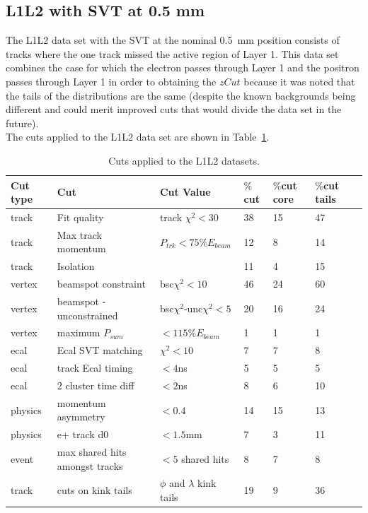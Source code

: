 \subsection{L1L2 with SVT at 0.5 mm}

The L1L2 data set with the SVT at the nominal 0.5~mm position consists of tracks where the one track missed the active region of Layer 1. This data set combines the case for which the electron passes through Layer 1 and the positron passes through Layer 1 in order to obtaining the $zCut$ because it was noted that the tails of the distributions are the same (despite the known backgrounds being different and could merit improved cuts that would divide the data set in the future). \\
\indent The cuts applied to the L1L2 data set are shown in Table~\ref{l1l2_cuts}. 

\begin{table}[H]
\caption{Cuts applied to the L1L2 datasets.}
\label{l1l2_cuts}
\centering
\begin{tabular}{lllllll}
\toprule
Cut type & Cut & Cut Value &  $\%$cut &  $\%$cut core & $\%$cut tails\\
\midrule
track & Fit quality & track $\chi^{2}<30$ & 38 & 15 & 47 \\
track & Max track momentum &  $P_{trk}<75\%E_{beam}$ & 12 & 8 & 14 \\
track & Isolation &   & 11 & 4 & 15 \\
vertex & beamspot constraint & bsc$\chi^{2}<10$  & 46 & 24 & 60 \\
vertex & beamspot - unconstrained & bsc$\chi^{2}$-unc$\chi^2<5$  & 20 & 16 & 24 \\
vertex & maximum $P_{sum}$ &  $<115\%E_{beam}$ & 1 & 1 & 1 \\
ecal & Ecal SVT matching & $\chi^2<10$  & 7 & 7 & 8 \\
ecal & track Ecal timing & $<4$ns  & 5 & 5 & 5 \\
ecal & 2 cluster time diff & $<2$ns  & 8 & 6 & 10 \\
physics & momentum asymmetry & $<0.4$  & 14 & 15 & 13 \\
physics & e+ track d0 & $<1.5$mm  & 7 & 3 & 11 \\
event & max shared hits amongst tracks & $<5$ shared hits  & 8 & 7 & 8 \\
track & cuts on kink tails & $\phi$ and $\lambda$ kink tails & 19 & 9 & 36 \\
\bottomrule
\end{tabular}
\end{table}

